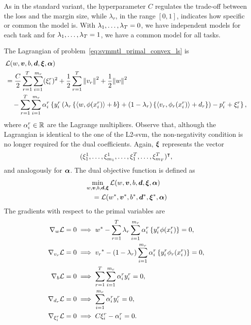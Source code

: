 As in the standard variant, the hyperparameter $C$ regulates the trade-off between the loss and the margin size, while $\lambda_r$, in the range $[0, 1]$, indicates how specific or common the model is. With $\lambda_1, \ldots, \lambda_T=0$, we have independent models for each task and for $\lambda_1, \ldots, \lambda_T=1$, we have a common model for all tasks. 
 


The Lagrangian of problem~\eqref{eq:svmmtl_primal_convex_ls} is
\begin{equation}\label{eq:svmmtl_lagrangian_convex_ls}
    \begin{aligned}
        & \lagr({w}, \fv{v}, b, \fv{d}, \fv{\xi}, \fv{\alpha}) \\
        &=  \frac{C}{2} \sum_{r= 1}^T \sum_{i=1}^{m_r} ({\xi_{i}^r})^2 + \frac{1}{2} \sum_{r= 1}^T{\norm{{v}_r}^2} + \frac{1}{2} {\norm{{w}}}^2 \\
        &\quad -  \sum_{r= 1}^T \sum_{i=1}^{m_r} \alpha_i^r \left\lbrace y_{i}^r  \left(\lambda_r \left\lbrace \dotp{w}{\phi(x_{i}^r)} + b  \right\rbrace + (1 - \lambda_r) \left\lbrace \dotp{{v}_r}{\phi_r(x_{i}^r)} + d_r \right\rbrace  \right) - p_{i}^r + \xi_{i}^r  \right\rbrace ,
    \end{aligned}
\end{equation}
where $\alpha_i^r \in \mathbb{R}$ are the Lagrange multipliers. Observe that, although the Lagrangian is identical to the one of the L2-\acrshort{svm}, the non-negativity condition is no longer required for the dual coefficients.  Again, $\bm{\xi}$ represents the vector $$(\xi_1^1, \ldots, \xi_{m_1}^1, \ldots, \xi_1^T, \ldots, \xi_{m_T}^T)^\intercal,$$ and analogously for $\bm{\alpha}$. The dual objective function is defined as 
\begin{equation}\nonumber
    \begin{aligned}
          &  \min_{{w}, \bm{v}, b, \bm{d}, \bm{\xi}} \mathcal{L}({w}, \bm{v}, b, \bm{d}, \bm{\xi}, \bm{\alpha}) \\
         &\quad = \mathcal{L}({{w}}^*, {\bm{v}}^*, {b}^*, {\bm{d}}^*, {\bm{\xi}}^*, \bm{\alpha})
    \end{aligned}    
\end{equation}
The gradients with respect to the primal variables are
\begin{align}
    \grad_{{w}} \lagr = 0  &\implies \optim{{w}} - \sum_{r= 1}^\ntasks \lambda_r \sum_{i=1}^{m_r} {\alpha_i^r} \left\lbrace y_i^r \phi(x_i^r) \right\rbrace = 0 , \label{eq:common_repr_conv_ls} \\
    \grad_{{v}_r} \lagr = 0 &\implies \optim{{v}_r} - (1 - \lambda_r) \sum_{i=1}^{m_r} {\alpha_i^r} \left\lbrace y_i^r \phi_r(x_i^r) \right\rbrace = 0 , \label{eq:specific_repr_conv_ls} \\
    \grad_{b} \lagr = 0  &\implies \sum_{r= 1}^T \sum_{i=1}^{m_r} {\alpha_i^r} y_i^r = 0 , \label{eq:specific_eqconstr_conv_ls}  \\
    \grad_{{d}_r} \lagr = 0 &\implies \sum_{i=1}^{m_r} {\alpha_i^r} y_i^r = 0 , \label{eq:common_eqconstr_conv_ls} \\
    \grad_{\xi_i^r} \lagr = 0 &\implies C \xi_i^r - {\alpha_i^r} = 0 . \label{eq:xi_feas_conv_ls}
\end{align}
